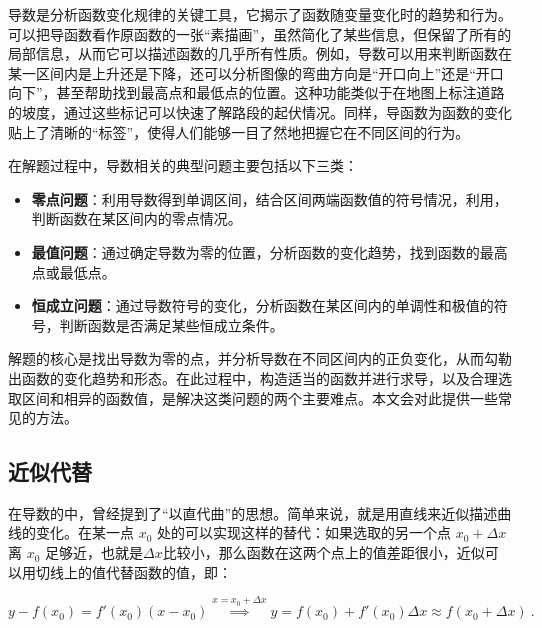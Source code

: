 
\begin{issues}
\issueDraft
\end{issues}


导数是分析函数变化规律的关键工具，它揭示了函数随变量变化时的趋势和行为。可以把导函数看作原函数的一张“素描画”，虽然简化了某些信息，但保留了所有的局部信息，从而它可以描述函数的几乎所有性质。例如，导数可以用来判断函数在某一区间内是上升还是下降，还可以分析图像的弯曲方向是“开口向上”还是“开口向下”，甚至帮助找到最高点和最低点的位置。这种功能类似于在地图上标注道路的坡度，通过这些标记可以快速了解路段的起伏情况。同样，导函数为函数的变化贴上了清晰的“标签”，使得人们能够一目了然地把握它在不同区间的行为。

在解题过程中，导数相关的典型问题主要包括以下三类：

\begin{itemize}
\item \textbf{零点问题}：利用导数得到单调区间，结合区间两端函数值的符号情况，利用，判断函数在某区间内的零点情况。
\item \textbf{最值问题}：通过确定导数为零的位置，分析函数的变化趋势，找到函数的最高点或最低点。
\item \textbf{恒成立问题}：通过导数符号的变化，分析函数在某区间内的单调性和极值的符号，判断函数是否满足某些恒成立条件。
\end{itemize}

解题的核心是找出导数为零的点，并分析导数在不同区间内的正负变化，从而勾勒出函数的变化趋势和形态。在此过程中，构造适当的函数并进行求导，以及合理选取区间和相异的函数值，是解决这类问题的两个主要难点。本文会对此提供一些常见的方法。

\subsection{近似代替}

在导数的中，曾经提到了“以直代曲”的思想。简单来说，就是用直线来近似描述曲线的变化。在某一点 $x_0$  处的可以实现这样的替代：如果选取的另一个点  $x_0 + \Delta x$  离  $x_0$  足够近，也就是$\Delta x$比较小，那么函数在这两个点上的值差距很小，近似可以用切线上的值代替函数的值，即：

\begin{equation}\label{eq_HsDerC_1}
y-f(x_0)=f'(x_0)(x-x_0)\overset{x=x_0+\Delta x}{\implies} y=f(x_0)+f'(x_0)\Delta x\approx f(x_0+\Delta x) ~.
\end{equation}

